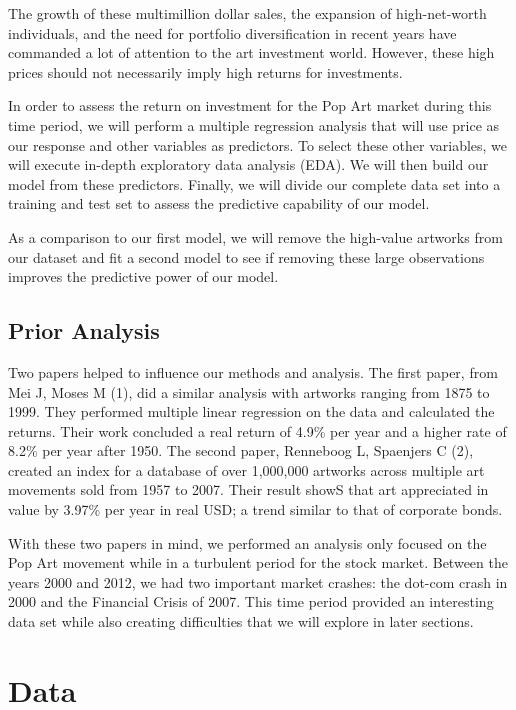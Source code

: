 \documentclass[]{asaproc}\usepackage[]{graphicx}\usepackage[]{color}
\begin{document}
The growth of these multimillion dollar sales, the expansion of high-net-worth individuals, and the need for portfolio diversification in recent years have commanded a lot of attention to the art investment world. However, these high prices should not necessarily imply high returns for investments.

In order to assess the return on investment for the Pop Art market during this time period, we will perform a multiple regression analysis that will use price as our response and other variables as predictors. To select these other variables, we will execute in-depth exploratory data analysis (EDA). We will then build our model from these predictors. Finally, we will divide our complete data set into a training and test set to assess the predictive capability of our model. 

As a comparison to our first model, we will remove the high-value artworks from our dataset and fit a second model to see if removing these large observations improves the predictive power of our model.


\subsection{Prior Analysis}

Two papers helped to influence our methods and analysis. 
The first paper, from Mei J, Moses M (1), did a similar analysis with artworks ranging from 1875 to 1999. They performed multiple linear regression on the data and calculated the returns. Their work concluded a real return of 4.9\% per year and a higher rate of 8.2\% per year after 1950. The second paper, Renneboog L, Spaenjers C (2), created an index for a database of over 1,000,000 artworks across multiple art movements sold from 1957 to 2007. Their result showS that art appreciated in value by 3.97\% per year in real USD; a trend similar to that of corporate bonds.

With these two papers in mind, we performed an analysis only focused on the Pop Art movement while in a turbulent period for the stock market. Between the years 2000 and 2012, we had two important market crashes: the dot-com crash in 2000 and the Financial Crisis of 2007. This time period provided an interesting data set while also creating difficulties that we will explore in later sections. 

\section{Data}
\end{document}
